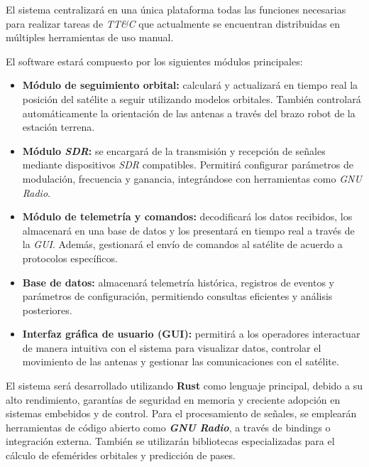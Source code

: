 El sistema centralizará en una única plataforma todas las funciones necesarias para realizar tareas de \textit{TT\&C} que actualmente se encuentran distribuidas en múltiples herramientas de uso manual.

El software estará compuesto por los siguientes módulos principales:

\begin{itemize}
    \item \textbf{Módulo de seguimiento orbital:} calculará y actualizará en tiempo real la posición del satélite a seguir utilizando modelos orbitales. También controlará automáticamente la orientación de las antenas a través del brazo robot de la estación terrena.
    
    \item \textbf{Módulo \textit{SDR}:} se encargará de la transmisión y recepción de señales mediante dispositivos \textit{SDR} compatibles. Permitirá configurar parámetros de modulación, frecuencia y ganancia, integrándose con herramientas como \textit{GNU Radio}.
    
    \item \textbf{Módulo de telemetría y comandos:} decodificará los datos recibidos, los almacenará en una base de datos y los presentará en tiempo real a través de la \textit{GUI}. Además, gestionará el envío de comandos al satélite de acuerdo a protocolos específicos.
    
    \item \textbf{Base de datos:} almacenará telemetría histórica, registros de eventos y parámetros de configuración, permitiendo consultas eficientes y análisis posteriores.
    
    \item \textbf{Interfaz gráfica de usuario (GUI):} permitirá a los operadores interactuar de manera intuitiva con el sistema para visualizar datos, controlar el movimiento de las antenas y gestionar las comunicaciones con el satélite.
\end{itemize}

El sistema será desarrollado utilizando \textbf{Rust} como lenguaje principal, debido a su alto rendimiento, garantías de seguridad en memoria y creciente adopción en sistemas embebidos y de control. Para el procesamiento de señales, se emplearán herramientas de código abierto como \textbf{\textit{GNU Radio}}, a través de bindings o integración externa. También se utilizarán bibliotecas especializadas para el cálculo de efemérides orbitales y predicción de pases.

